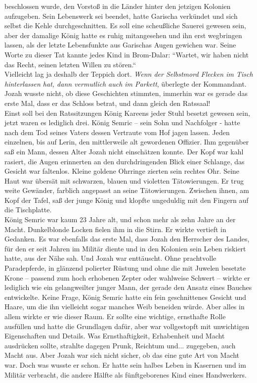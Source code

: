 beschlossen wurde, den Vorstoß in die Länder hinter den jetzigen Kolonien aufzugeben. Sein 
Lebenswerk sei beendet, hatte Garischa verkündet und sich selbst die Kehle durchgeschnitten. Es soll 
eine scheußliche Sauerei gewesen sein, aber der damalige König hatte es ruhig mitangesehen und ihn 
erst wegbringen lassen, als der letzte Lebensfunkte aus Garischas Augen gewichen war. Seine Worte zu 
dieser Tat kannte jedes Kind in Brom-Dalar: ``Wartet, wir haben nicht das Recht, seinen letzten 
Willen zu stören.``\\ 
Vielleicht lag ja deshalb der Teppich dort. \textit{Wenn der Selbstmord Flecken im Tisch 
hinterlassen hat, dann vermutlich auch im Parkett}, überlegte der Kommandant.\\
Jozah wusste nicht, ob diese Geschichten stimmten, immerhin war es gerade das erste Mal, dass er das 
Schloss betrat, und dann gleich den Ratssaal!\\
Einst soll bei den Ratssitzungen König Kareens jeder Stuhl besetzt gewesen sein, jetzt waren es 
lediglich drei. König Semric – sein Sohn und Nachfolger - hatte nach dem Tod seines Vaters dessen 
Vertraute vom Hof jagen lassen. Jeden einzelnen, bis auf Lerin, den mittlerweile alt gewordenen 
Offizier. Ihm gegenüber saß ein Mann, dessen Alter Jozah nicht einschätzen konnte. Der Kopf war 
kahl rasiert, die Augen erinnerten an den durchdringenden Blick einer Schlange, das Gesicht war 
faltenlos. Kleine goldene Ohrringe zierten sein rechtes Ohr. Seine Haut war übersät mit schwarzen, 
blauen und violetten Tätowierungen. Er trug weite Gewänder, farblich angepasst an seine 
Tätowierungen. Zwischen ihnen, am Kopf der Tafel, saß der junge König und klopfte ungeduldig mit 
den Fingern auf die Tischplatte. \\
König Semric war kaum 23 Jahre alt, und schon mehr als zehn Jahre an der Macht. Dunkelblonde Locken 
fielen ihm in die Stirn. Er wirkte vertieft in Gedanken. Es war ebenfalls das erste Mal, dass Jozah 
den Herrscher des Landes, für den er seit Jahren im Militär diente und in den Kolonien sein Leben 
riskiert hatte, aus der Nähe sah. Und Jozah war enttäuscht. Ohne  prachtvolle Paradepferde, in 
glänzend polierter Rüstung und ohne die mit Juwelen besetzte Krone – passend zum hoch erhobenen 
Zepter oder wahlweise Schwert – wirkte er lediglich wie ein gelangweilter junger Mann, der gerade 
den Ansatz eines Bauches entwickelte. Keine Frage, König Semric hatte ein fein geschnittenes 
Gesicht und Haare, um die ihn vielleicht sogar manches Weib beneiden würde. Aber alles in allem 
wirkte er wie dieser Raum. Er sollte eine wichtige, ernsthafte Rolle ausfüllen und hatte die 
Grundlagen dafür, aber war vollgestopft mit unwichtigen Eigenschaften und Details. Was 
Ernsthaftigkeit, Erhabenheit und Macht ausdrücken sollte, strahlte dagegen Prunk, Reichtum und... 
zugegeben, auch Macht aus. Aber Jozah war sich nicht sicher, ob das eine gute Art von Macht war. 
Doch was wusste er schon. Er hatte sein halbes Leben in Kasernen und im Militär verbracht, die 
andere Hälfte als fünftgeborenes Kind eines Handwerkers.\\

